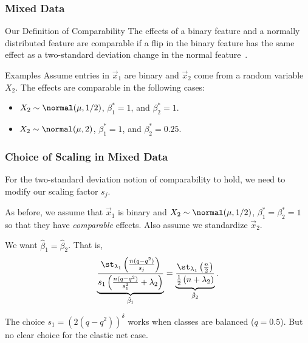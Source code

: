 \documentclass[aspectratio=1610,onlytextwidth]{beamer}
\begin{document}
\begin{frame}[c]
  \frametitle{Mixed Data}

  \begin{block}{Our Definition of Comparability}
    The effects of a binary feature and a normally distributed feature are \alert{comparable} if a flip in the binary feature has the same effect as a two-standard deviation change in the normal feature~\parencite{gelman2008}.
  \end{block}

  \pause

  \begin{exampleblock}{Examples}
    Assume entries in \(\vec{x}_1\) are binary and \(\vec{x}_2\) come from a random variable \(X_2\). The effects are comparable in the following cases:
    \begin{itemize}
      \item \(X_2 \sim \normal(\mu, 1/2)\), \(\beta_1^* = 1\), and \(\beta_2^* = 1\).
      \item \(X_2 \sim \normal(\mu, 2)\), \(\beta_1^* = 1\), and \(\beta_2^* = 0.25\).
    \end{itemize}
  \end{exampleblock}
\end{frame}

\begin{frame}[c]
  \frametitle{Choice of Scaling in Mixed Data}

  For the two-standard deviation notion of comparability to hold, we need to modify our
  scaling factor \(s_j\).

  \bigskip\pause

  As before, we assume that \(\vec{x}_1\) is binary and \(X_2 \sim \normal(\mu, 1/2)\),
  \(\beta_1^* = \beta_2^* = 1\) so that they have \emph{comparable} effects. Also assume we
  standardize \(\vec{x}_2\).

  \medskip

  We want \(\hat{\beta}_1 = \hat{\beta}_2\). That is,
  \[
    \underbrace{\frac{\st_{\lambda_1}\left(\frac{n (q - q^2)}{s_j}\right)}{s_1\left(\frac{n(q - q^2)}{s_1^2} + \lambda_2\right)}}_{\hat{\beta}_1}  = \underbrace{\frac{\st_{\lambda_1}\left(\frac{n}{2}\right)}{\frac{1}{2}\left(n + \lambda_2\right)}}_{\hat{\beta}_2}.
  \]

  \medskip\pause

  The choice \(s_1 = (2 (q - q^2))^\delta\) works when classes are balanced (\(q = 0.5\)).
  But no clear choice for the elastic net case.
\end{frame}
\end{document}

